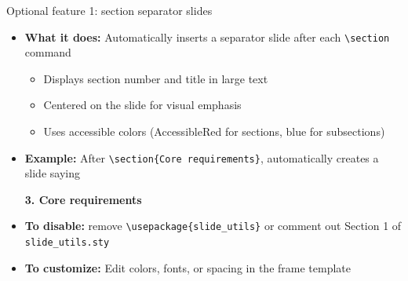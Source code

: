 \begin{frame}{Optional feature 1: section separator slides}

\begin{itemize}
\item \textbf{What it does:} Automatically inserts a separator slide after each \texttt{\textbackslash section} command
  \begin{itemize}
  \item Displays section number and title in large text
  \item Centered on the slide for visual emphasis
  \item Uses accessible colors (AccessibleRed for sections, blue for subsections)
  \end{itemize}

\bigskip

\item \textbf{Example:} After \texttt{\textbackslash section\{Core requirements\}}, automatically creates a slide saying

  \bigskip
  \begin{center}
  {\color{AccessibleRed}\Large\bfseries 3. Core requirements}
  \end{center}

\bigskip

\item \textbf{To disable:} remove \texttt{\textbackslash usepackage\{slide\_utils\}} or comment out Section 1 of \texttt{slide\_utils.sty}
\item \textbf{To customize:} Edit colors, fonts, or spacing in the frame template
\end{itemize}
\end{frame}

